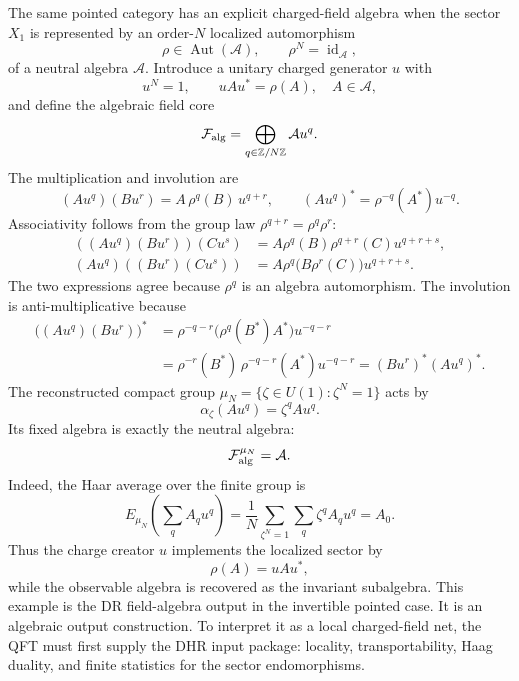 \begin{example}
\label{ex:dr-pointed-crossed-product-field-algebra}
The same pointed category has an explicit charged-field algebra when the
sector \(X_1\) is represented by an order-\(N\) localized automorphism
\[
  \rho\in\operatorname{Aut}(\mathcal A),
  \qquad
  \rho^N=\operatorname{id}_{\mathcal A},
\]
of a neutral algebra \(\mathcal A\).  Introduce a unitary charged generator
\(u\) with
\[
  u^N=1,\qquad uAu^*=\rho(A),\quad A\in\mathcal A,
\]
and define the algebraic field core
\begin{equation}
  \mathcal F_{\rm alg}
  =
  \bigoplus_{q\in\mathbb Z/N\mathbb Z}\mathcal A u^q .
  \label{eq:dr-pointed-crossed-product-core}
\end{equation}
The multiplication and involution are
\begin{equation}
  (Au^q)(Bu^r)
  =
  A\,\rho^q(B)\,u^{q+r},
  \qquad
  (Au^q)^*
  =
  \rho^{-q}(A^*)u^{-q}.
  \label{eq:dr-pointed-crossed-product-operations}
\end{equation}
Associativity follows from the group law \(\rho^{q+r}=\rho^q\rho^r\):
\[
\begin{aligned}
  ((Au^q)(Bu^r))(Cu^s)
  &=
  A\rho^q(B)\rho^{q+r}(C)u^{q+r+s},\\
  (Au^q)((Bu^r)(Cu^s))
  &=
  A\rho^q\!\bigl(B\rho^r(C)\bigr)u^{q+r+s}.
\end{aligned}
\]
The two expressions agree because \(\rho^q\) is an algebra automorphism.  The
involution is anti-multiplicative because
\[
\begin{aligned}
  \bigl((Au^q)(Bu^r)\bigr)^*
  &=
  \rho^{-q-r}\!\bigl(\rho^q(B^*)A^*\bigr)u^{-q-r}  \\
  &=
  \rho^{-r}(B^*)\,\rho^{-q-r}(A^*)u^{-q-r}
  =
  (Bu^r)^*(Au^q)^* .
\end{aligned}
\]
The reconstructed compact group
\(\mu_N=\{\zeta\in U(1):\zeta^N=1\}\) acts by
\begin{equation}
  \alpha_\zeta(Au^q)=\zeta^q Au^q .
  \label{eq:dr-pointed-crossed-product-gauge-action}
\end{equation}
Its fixed algebra is exactly the neutral algebra:
\[
  \mathcal F_{\rm alg}^{\mu_N}=\mathcal A .
\]
Indeed, the Haar average over the finite group is
\[
  E_{\mu_N}\!\left(\sum_q A_q u^q\right)
  =
  \frac1N\sum_{\zeta^N=1}\sum_q \zeta^q A_q u^q
  =
  A_0 .
\]
Thus the charge creator \(u\) implements the localized sector by
\[
  \rho(A)=uAu^*,
\]
while the observable algebra is recovered as the invariant subalgebra.  This
example is the DR field-algebra output in the invertible pointed case.  It is
an algebraic output construction.  To interpret it as a local charged-field
net, the QFT must first supply the DHR input package: locality,
transportability, Haag duality, and finite statistics for the sector
endomorphisms.
\end{example}

